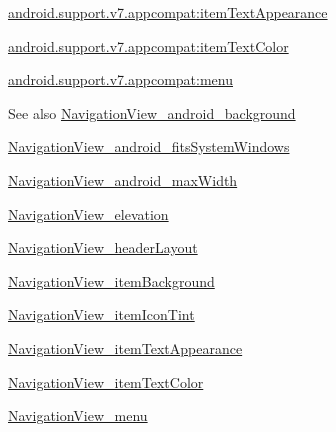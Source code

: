 {\ttfamily \hyperlink{classandroid_1_1support_1_1v7_1_1appcompat_1_1R_1_1styleable_acbb9457e65af01969c57837ac859986e}{android.\+support.\+v7.\+appcompat\+:item\+Text\+Appearance}}

{\ttfamily \hyperlink{classandroid_1_1support_1_1v7_1_1appcompat_1_1R_1_1styleable_a98cf51058598ae6414a496b3e7c57977}{android.\+support.\+v7.\+appcompat\+:item\+Text\+Color}}

{\ttfamily \hyperlink{classandroid_1_1support_1_1v7_1_1appcompat_1_1R_1_1styleable_a84980c41303c37f3fe37afc6d389b2cf}{android.\+support.\+v7.\+appcompat\+:menu}}

\begin{DoxySeeAlso}{See also}
\hyperlink{classandroid_1_1support_1_1v7_1_1appcompat_1_1R_1_1styleable_ad2f7cafaca85dee660d34efdbbba270b}{Navigation\+View\+\_\+android\+\_\+background} 

\hyperlink{classandroid_1_1support_1_1v7_1_1appcompat_1_1R_1_1styleable_aec5d356c8231527e8f7c1febb5eb9892}{Navigation\+View\+\_\+android\+\_\+fits\+System\+Windows} 

\hyperlink{classandroid_1_1support_1_1v7_1_1appcompat_1_1R_1_1styleable_a7ee62bbed79d58ceb628d59bef150cec}{Navigation\+View\+\_\+android\+\_\+max\+Width} 

\hyperlink{classandroid_1_1support_1_1v7_1_1appcompat_1_1R_1_1styleable_a9b37fb60ab34a99e03f8fd95245baa0c}{Navigation\+View\+\_\+elevation} 

\hyperlink{classandroid_1_1support_1_1v7_1_1appcompat_1_1R_1_1styleable_a25d0749f6f4b3021640c947c8f4790fd}{Navigation\+View\+\_\+header\+Layout} 

\hyperlink{classandroid_1_1support_1_1v7_1_1appcompat_1_1R_1_1styleable_a245c0ec3356c0065fcc832a44ad5c26b}{Navigation\+View\+\_\+item\+Background} 

\hyperlink{classandroid_1_1support_1_1v7_1_1appcompat_1_1R_1_1styleable_a045753abfbdae682420f420a25f71659}{Navigation\+View\+\_\+item\+Icon\+Tint} 

\hyperlink{classandroid_1_1support_1_1v7_1_1appcompat_1_1R_1_1styleable_acbb9457e65af01969c57837ac859986e}{Navigation\+View\+\_\+item\+Text\+Appearance} 

\hyperlink{classandroid_1_1support_1_1v7_1_1appcompat_1_1R_1_1styleable_a98cf51058598ae6414a496b3e7c57977}{Navigation\+View\+\_\+item\+Text\+Color} 

\hyperlink{classandroid_1_1support_1_1v7_1_1appcompat_1_1R_1_1styleable_a84980c41303c37f3fe37afc6d389b2cf}{Navigation\+View\+\_\+menu} 
\end{DoxySeeAlso}
\mbox{\label{classandroid_1_1support_1_1v7_1_1appcompat_1_1R_1_1styleable_ad2f7cafaca85dee660d34efdbbba270b}} 
